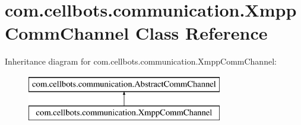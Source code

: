 \hypertarget{classcom_1_1cellbots_1_1communication_1_1_xmpp_comm_channel}{\section{com.\-cellbots.\-communication.\-Xmpp\-Comm\-Channel Class Reference}
\label{classcom_1_1cellbots_1_1communication_1_1_xmpp_comm_channel}
}
Inheritance diagram for com.\-cellbots.\-communication.\-Xmpp\-Comm\-Channel\-:\begin{figure}[H]
\begin{center}
\leavevmode
\includegraphics[height=2.000000cm]{classcom_1_1cellbots_1_1communication_1_1_xmpp_comm_channel}
\end{center}
\end{figure}
